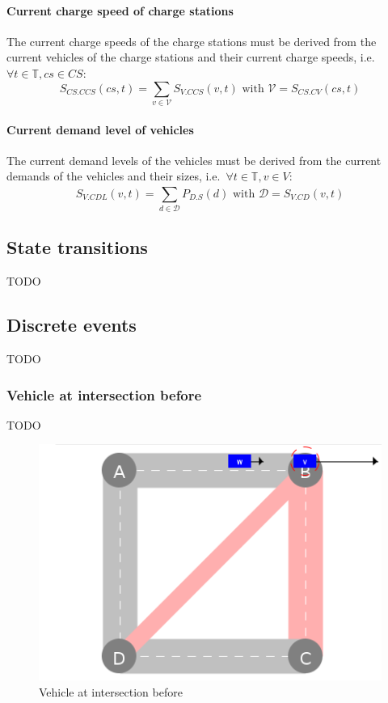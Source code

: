 \documentclass{IEEEtran}
\begin{document}
    \paragraph{Current charge speed of charge stations}
    The current charge speeds of the charge stations must be derived from the current vehicles of the charge stations and their current charge speeds, i.e.\ $\forall t \in \mathbb{T}, cs \in CS:$
    \[
        S_{CS.CCS}(cs,t)=\sum_{v \in \mathcal{V}}S_{V.CCS}(v,t) \textrm{ with } \mathcal{V}=S_{CS.CV}(cs,t)
    \]

    \paragraph{Current demand level of vehicles}
    The current demand levels of the vehicles must be derived from the current demands of the vehicles and their sizes, i.e.\ $\forall t \in \mathbb{T}, v \in V:$
    \[
        S_{V.CDL}(v,t)=\sum_{d \in \mathcal{D}}^{}P_{D.S}(d) \textrm{ with } \mathcal{D}=S_{V.CD}(v,t)
    \]

    \subsection{State transitions}
    \label{sec:transitions}
    TODO

    \subsection{Discrete events}
    \label{sec:events}
    TODO

    \subsubsection{Vehicle at intersection before}
    TODO

    \begin{figure}[htbp]
        \centering
        \includegraphics[scale=0.5]{../../events/vehicle-at-intersection-before.png}
        \caption{Vehicle at intersection before}
        \label{fig:vehicle-at-intersection-before}
    \end{figure}
\end{document}
